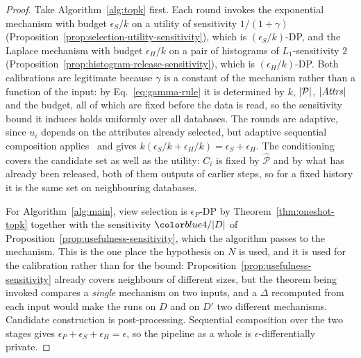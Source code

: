 \begin{proof}
Take Algorithm~\ref{alg:topk} first.
Each round invokes the exponential mechanism with budget $\epsilon_S/k$ on a utility of sensitivity $1/(1+\gamma)$ (Proposition~\ref{prop:selection-utility-sensitivity}), which is $(\epsilon_S/k)$-DP, and the Laplace mechanism with budget $\epsilon_H/k$ on a pair of histograms of $L_1$-sensitivity $2$ (Proposition~\ref{prop:histogram-release-sensitivity}), which is $(\epsilon_H/k)$-DP.
Both calibrations are legitimate because $\gamma$ is a constant of the mechanism rather than a function of the input: by Eq.~\eqref{eq:gamma-rule} it is determined by $k$, $|\mathcal{P}|$, $|\mathit{Attrs}|$ and the budget, all of which are fixed before the data is read, so the sensitivity bound it induces holds uniformly over all databases.
The rounds are adaptive, since $u_i$ depends on the attributes already selected, but adaptive sequential composition applies~\cite{DBLP:series/synthesis/2016Li} and gives $k(\epsilon_S/k+\epsilon_H/k)=\epsilon_S+\epsilon_H$.
The conditioning covers the candidate set as well as the utility: $C_i$ is fixed by $\widehat{\mathcal{P}}$ and by what has already been released, both of them outputs of earlier steps, so for a fixed history it is the same set on neighbouring databases.

For Algorithm~\ref{alg:main}, view selection is $\epsilon_P$-DP by Theorem~\ref{thm:oneshot-topk} together with the sensitivity $\added{4/|D|}$ of Proposition~\ref{prop:usefulness-sensitivity}, which the algorithm passes to the mechanism.
This is the one place the hypothesis on $N$ is used, and it is used for the calibration rather than for the bound: Proposition~\ref{prop:usefulness-sensitivity} already covers neighbours of different sizes, but the theorem being invoked compares a \emph{single} mechanism on two inputs, and a $\Delta$ recomputed from each input would make the runs on $D$ and on $D'$ two different mechanisms.
Candidate construction is post-processing.
Sequential composition over the two stages gives $\epsilon_P+\epsilon_S+\epsilon_H=\epsilon$, so the pipeline as a whole is $\epsilon$-differentially private.
\end{proof}

